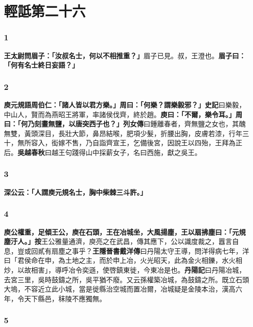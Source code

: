 \chapter{輕詆第二十六}

\subsection*{1}

\textbf{王太尉問眉子：「汝叔名士，何以不相推重？」}{\footnotesize 眉子已見。叔，王澄也。}\textbf{眉子曰：「何有名士終日妄語？」}

\subsection*{2}

\textbf{庾元規語周伯仁：「諸人皆以君方樂。」周曰：「何樂？謂樂毅邪？」}{\footnotesize \textbf{史記}曰樂毅，中山人，賢而為燕昭王將軍，率諸侯伐齊，終於趙。}\textbf{庾曰：「不爾，樂令耳。」周曰：「何乃刻畫無鹽，以唐突西子也？」}{\footnotesize \textbf{列女傳}曰鍾離春者，齊無鹽之女也，其醜無雙，黃頭深目，長壯大節，鼻昂結喉，肥項少髮，折腰出胸，皮膚若漆，行年三十，無所容入，衒嫁不售，乃自詣齊宣王，乞備後宮，因說王以四殆，王拜為正后。\textbf{吳越春秋}曰越王句踐得山中採薪女子，名曰西施，獻之吳王。}

\subsection*{3}

\textbf{深公云：「人謂庾元規名士，胸中柴棘三斗許。」}

\subsection*{4}

\textbf{庾公權重，足傾王公，庾在石頭，王在冶城坐，大風揚塵，王以扇拂塵曰：「元規塵汙人。」}{\footnotesize \textbf{按}王公雅量通濟，庾亮之在武昌，傳其應下，公以識度裁之，囂言自息，豈或回貳有扇塵之事乎？\textbf{王隱晉書戴洋傳}曰丹陽太守王導，問洋得病七年，洋曰「君侯命在申，為土地之主，而於申上冶，火光昭天，此為金火相鑠，水火相炒，以故相害」，導呼冶令奕遜，使啓鎮東徙，今東冶是也。\textbf{丹陽記}曰丹陽冶城，去宮三里，吳時鼓鑄之所，吳平猶不廢。又云孫權築冶城，為鼓鑄之所。既立石頭大塢，不容近立此小城，當是徙縣治空城而置冶爾，冶城疑是金陵本治，漢高六年，令天下縣邑，秣陵不應獨無。}

\subsection*{5}

